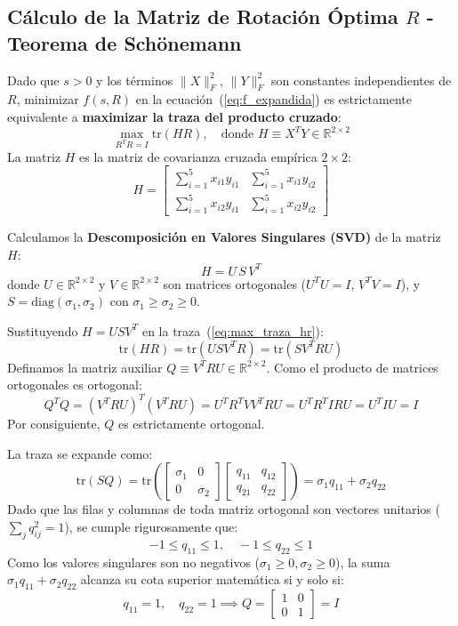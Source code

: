 \documentclass[11pt,a4paper,openany]{book}
\theoremstyle{definition}
\begin{document}
\subsection{Cálculo de la Matriz de Rotación Óptima \texorpdfstring{$R$}{R} - Teorema de Schönemann}
Dado que $s > 0$ y los términos $\|X\|_F^2$, $\|Y\|_F^2$ son constantes independientes de $R$, minimizar $f(s, R)$ en la ecuación~(\ref{eq:f_expandida}) es estrictamente equivalente a \textbf{maximizar la traza del producto cruzado}:
\begin{equation}
\max_{R^T R = I} \text{tr}(H R), \quad \text{donde } H \equiv X^T Y \in \mathbb{R}^{2 \times 2}
\label{eq:max_traza_hr}
\end{equation}
La matriz $H$ es la matriz de covarianza cruzada empírica $2 \times 2$:
\begin{equation}
H = \begin{bmatrix}
\sum_{i=1}^5 x_{i1} y_{i1} & \sum_{i=1}^5 x_{i1} y_{i2} \\
\sum_{i=1}^5 x_{i2} y_{i1} & \sum_{i=1}^5 x_{i2} y_{i2}
\end{bmatrix}
\end{equation}

Calculamos la \textbf{Descomposición en Valores Singulares (SVD)} de la matriz $H$:
\begin{equation}
H = U \, S \, V^T
\end{equation}
donde $U \in \mathbb{R}^{2 \times 2}$ y $V \in \mathbb{R}^{2 \times 2}$ son matrices ortogonales ($U^T U = I$, $V^T V = I$), y $S = \text{diag}(\sigma_1, \sigma_2)$ con $\sigma_1 \ge \sigma_2 \ge 0$.

Sustituyendo $H = U S V^T$ en la traza~(\ref{eq:max_traza_hr}):
$$\text{tr}(H R) = \text{tr}(U S V^T R) = \text{tr}(S V^T R U)$$
Definamos la matriz auxiliar $Q \equiv V^T R U \in \mathbb{R}^{2 \times 2}$. Como el producto de matrices ortogonales es ortogonal:
$$Q^T Q = (V^T R U)^T (V^T R U) = U^T R^T V V^T R U = U^T R^T I R U = U^T I U = I$$
Por consiguiente, $Q$ es estrictamente ortogonal.

La traza se expande como:
$$\text{tr}(S Q) = \text{tr}\left( \begin{bmatrix} \sigma_1 & 0 \\ 0 & \sigma_2 \end{bmatrix} \begin{bmatrix} q_{11} & q_{12} \\ q_{21} & q_{22} \end{bmatrix} \right) = \sigma_1 q_{11} + \sigma_2 q_{22}$$
Dado que las filas y columnas de toda matriz ortogonal son vectores unitarios ($\sum_j q_{ij}^2 = 1$), se cumple rigurosamente que:
$$-1 \le q_{11} \le 1, \quad -1 \le q_{22} \le 1$$
Como los valores singulares son no negativos ($\sigma_1 \ge 0, \sigma_2 \ge 0$), la suma $\sigma_1 q_{11} + \sigma_2 q_{22}$ alcanza su cota superior matemática si y solo si:
$$q_{11} = 1, \quad q_{22} = 1 \implies Q = \begin{bmatrix} 1 & 0 \\ 0 & 1 \end{bmatrix} = I$$
\end{document}
